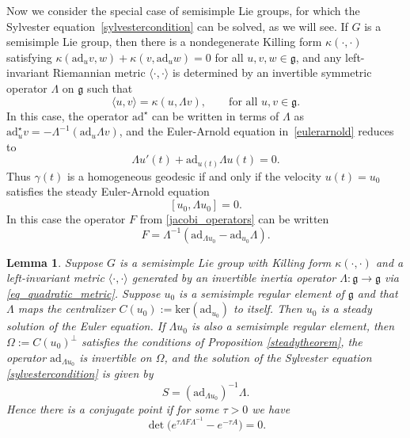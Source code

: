 \documentclass[oneside, 11pt]{amsart}
\newtheorem{lemma}[theorem]{Lemma}
\numberwithin{equation}{section}
\newcommand{\ad}{\mathrm{ad}}
\newcommand{\adstar}{\ad^{\star}}
\newcommand{\bim}{\kappa}
\newcommand{\subby}{\Omega}
\newcommand{\simpkill}{\kappa}
\newcommand{\Syl}{S}
\newcommand{\eulerop}{F}
\newcommand{\adop}{A}
\begin{document}
  
 
Now we consider the special case of semisimple Lie groups, for which the Sylvester equation~\eqref{sylvestercondition} can be solved, as we will see. If $G$ is a semisimple Lie group, then there is a nondegenerate Killing form $\bim(\cdot, \cdot)$ satisfying $\bim(\ad_uv, w) + \bim(v, \ad_uw) = 0$ for all $u,v,w\in \mathfrak{g}$, and any left-invariant  
Riemannian metric $\langle\cdot, \cdot\rangle$ is determined by an invertible symmetric operator $\Lambda$ on $\mathfrak{g}$ such that
\begin{equation}\label{eq_quadratic_metric}
\langle u, v \rangle = \kappa(u, \Lambda v), \qquad \text{for all } u, v \in \mathfrak{g}.
\end{equation}
In this case, the operator $\adstar$ can be written in terms of $\Lambda$ as $\adstar_uv = -\Lambda^{-1}(\ad_u\Lambda v)$, and the Euler-Arnold equation in~\eqref{eulerarnold} reduces to
\begin{equation*}\label{eulerarnoldlambda} 
\Lambda u'(t) + \ad_{u(t)}\Lambda u(t) = 0.
\end{equation*}
Thus $\gamma(t)$ is a homogeneous geodesic if and only if the velocity $u(t)=u_0$ satisfies the steady Euler-Arnold equation $$[u_0,\Lambda u_0] = 0.$$
In this case the operator $\eulerop$ from \eqref{jacobi_operators} can be written 
\begin{equation}\label{Fquadratic}
   \eulerop  
   = \Lambda^{-1}(\ad_{\Lambda u_0} - \ad_{u_0}\Lambda). 
\end{equation}
  
  
 

     



\begin{lemma}\label{sylvesterregular}
    Suppose $G$ is a semisimple Lie group with Killing form $\simpkill(\cdot,\cdot)$ and a left-invariant metric $\langle \cdot, \cdot\rangle$ generated by an invertible inertia operator $\Lambda\colon \mathfrak{g}\to\mathfrak{g}$ via \eqref{eq_quadratic_metric}. 
    Suppose $u_0$ is a semisimple regular element of $\mathfrak{g}$ and that $\Lambda$ maps the centralizer $C(u_0):=\mathrm{ker}(\ad_{u_0})$ to itself. Then $u_0$ is a steady solution of the Euler equation. If $\Lambda u_0$ is also a semisimple regular element, then $\subby:=C(u_0)^{\perp}$ satisfies the conditions of Proposition \ref{steadytheorem}, the operator $\ad_{\Lambda u_0}$ is invertible on $\Omega$, and the solution of the Sylvester equation \eqref{sylvestercondition} is given by 
    \begin{equation}\label{sylvestersoln}
        \Syl = \left(\ad_{\Lambda u_0}\right)^{-1}\Lambda. 
    \end{equation} 
    Hence there is a conjugate point if for some $\tau>0$ we have 
    \begin{equation}\label{determinantnew}
        \det{\big(e^{\tau \Lambda \eulerop\Lambda^{-1}} - e^{-\tau \adop}\big)} = 0.
    \end{equation}
\end{lemma}
\end{document}
